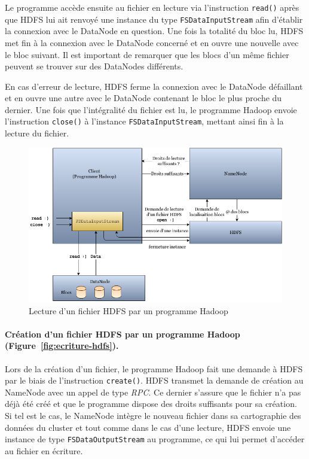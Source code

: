 \par Le programme accède ensuite au fichier en lecture via l'instruction \texttt{read()} après que HDFS lui ait renvoyé une instance du type \texttt{FSDataInputStream} afin d'établir la connexion avec le DataNode en question. Une fois la totalité du bloc lu, HDFS met fin à la connexion avec le DataNode concerné et en ouvre une nouvelle avec le bloc suivant. Il est important de remarquer que les blocs d'un même fichier peuvent se trouver sur des DataNodes différents.

\par En cas d'erreur de lecture, HDFS ferme la connexion avec le DataNode défaillant et en ouvre une autre avec le DataNode contenant le bloc le plus proche du dernier. Une fois que l'intégralité du fichier est lu, le programme Hadoop envoie l'instruction \texttt{close()} à l'instance \texttt{FSDataInputStream}, mettant ainsi fin à la lecture du fichier.

\begin{figure}[h!]
  \centering
  \includegraphics[width=16cm]{images/reading_file.png}
  \caption{Lecture d'un fichier HDFS par un programme Hadoop}
  \label{fig:lecture-hdfs}
\end{figure}

\paragraph{Création d'un fichier HDFS par un programme Hadoop (Figure~\ref{fig:ecriture-hdfs}).} Lors de la création d'un fichier, le programme Hadoop fait une demande à HDFS par le biais de l'instruction \texttt{create()}. HDFS transmet la demande de création au NameNode avec un appel de type \textit{RPC}. Ce dernier s'assure que le fichier n'a pas déjà été créé et que le programme dispose des droits suffisants pour sa création. Si tel est le cas, le NameNode intègre le nouveau fichier dans sa cartographie des données du cluster et tout comme dans le cas d'une lecture, HDFS envoie une instance de type \texttt{FSDataOutputStream} au programme, ce qui lui permet d'accéder au fichier en écriture.

